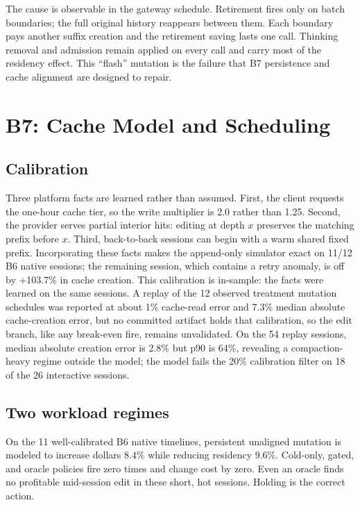 \documentclass[10pt,twocolumn]{article}
\begin{document}
The cause is observable in the gateway schedule.  Retirement fires only on batch boundaries; the
full original history reappears between them.  Each boundary pays another suffix creation and the
retirement saving lasts one call.  Thinking removal and admission remain applied on every call and
carry most of the residency effect.  This ``flash'' mutation is the failure that B7 persistence and
cache alignment are designed to repair.

\section{B7: Cache Model and Scheduling}

\subsection{Calibration}

Three platform facts are learned rather than assumed.  First, the client requests the one-hour cache
tier, so the write multiplier is 2.0 rather than 1.25.  Second, the provider serves partial interior
hits: editing at depth $x$ preserves the matching prefix before $x$.  Third, back-to-back sessions can
begin with a warm shared fixed prefix.  Incorporating these facts makes the append-only simulator exact
on 11/12 B6 native sessions; the remaining session, which contains a retry anomaly, is off by +103.7\%
in cache creation.  This calibration is in-sample: the facts were learned on the same sessions.  A
replay of the 12 observed treatment mutation schedules was reported at about 1\% cache-read error and
7.3\% median absolute cache-creation error, but no committed artifact holds that calibration, so the
edit branch, like any break-even fire, remains unvalidated.  On the 54 replay sessions, median absolute
creation error is 2.8\% but p90 is 64\%, revealing a compaction-heavy regime outside the model; the
model fails the 20\% calibration filter on 18 of the 26 interactive sessions.

\subsection{Two workload regimes}

On the 11 well-calibrated B6 native timelines, persistent unaligned mutation is modeled to increase
dollars 8.4\% while reducing residency 9.6\%.  Cold-only, gated, and oracle policies fire zero times
and change cost by zero.  Even an oracle finds no profitable mid-session edit in these short, hot
sessions.  Holding is the correct action.
\end{document}
